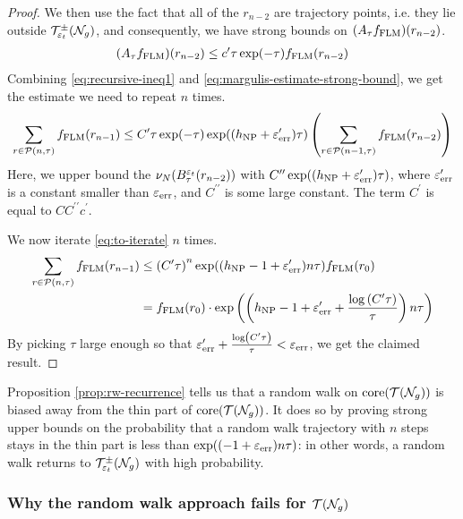 \begin{proof}
  We then use the fact that all of the $r_{n-2}$ are \concave trajectory points, i.e. they lie outside $\mathcal{T}_{\varepsilon_t}^{\pm}(\mathcal{N}_g)$, and consequently, we have strong bounds on $(A_{\tau} f_{\mathrm{FLM}})(r_{n-2})$.
  \begin{align}
    \label{eq:margulis-estimate-strong-bound}
    (A_{\tau}f_{\mathrm{FLM}})(r_{n-2}) \leq c^{\prime} \tau \exp(-\tau) f_{\mathrm{FLM}}(r_{n-2})
  \end{align}
  Combining \eqref{eq:recursive-ineq1} and \eqref{eq:margulis-estimate-strong-bound}, we get the estimate we need to repeat $n$ times.
  \begin{align}
    \label{eq:to-iterate}
    \sum_{r \in \mathcal{P}(n, \tau)} f_{\mathrm{FLM}}(r_{n-1}) \leq C^{\prime} \tau \exp(-\tau) \exp((h_{\mathrm{NP}} + \varepsilon_{\mathrm{err}}^{\prime})\tau) \left( \sum_{r \in \mathcal{P}(n-1, \tau)} f_{\mathrm{FLM}}(r_{n-2}) \right)
  \end{align}
  Here, we upper bound the $\nu_N(B_{\tau}^{\varepsilon_t}(r_{n-2}))$ with $C^{\prime \prime} \exp((h_{\mathrm{NP}} + \varepsilon_{\mathrm{err}}^{\prime})\tau)$, where $\varepsilon_{\mathrm{err}}^{\prime}$ is a constant smaller than $\varepsilon_{\mathrm{err}}$, and $C^{\prime \prime}$ is some large constant.
  The term $C^{\prime}$ is equal to $C C^{\prime \prime} c^{\prime}$.

  We now iterate \eqref{eq:to-iterate} $n$ times.
  \begin{align*}
    \sum_{r \in \mathcal{P}(n, \tau)} f_{\mathrm{FLM}}(r_{n-1}) &\leq \left( C^{\prime} \tau \right)^n \exp((h_{\mathrm{NP}} - 1 + \varepsilon_{\mathrm{err}}^{\prime})n\tau) f_{\mathrm{FLM}}(r_0) \\
                                              &= f_{\mathrm{FLM}}(r_0) \cdot \exp\left( \left( h_{\mathrm{NP}} - 1 + \varepsilon_{\mathrm{err}}^{\prime} + \frac{\log\left( C^{\prime} \tau \right)}{\tau} \right) n\tau \right)
  \end{align*}
  By picking $\tau$ large enough so that $\varepsilon_{\mathrm{err}}^{\prime} + \frac{\log\left( C^{\prime} \tau \right)}{\tau} < \varepsilon_{\mathrm{err}}$, we get the claimed result.
\end{proof}

Proposition \ref{prop:rw-recurrence} tells us that a random walk on $\mathrm{core}(\mathcal{T}(\mathcal{N}_g))$ is biased away from the thin part of $\mathrm{core}(\mathcal{T}(\mathcal{N}_g))$.
It does so by proving strong upper bounds on the probability that a random walk trajectory with $n$ steps stays in the thin part is less than $\exp((-1 + \varepsilon_{\mathrm{err}})n\tau)$: in other words, a random walk returns to $\mathcal{T}_{\varepsilon_t}^{\pm}(\mathcal{N}_g)$ with high probability.

\subsubsection{Why the random walk approach fails for $\mathcal{T}(\mathcal{N}_g)$}
\label{sec:why-approach-fails}

